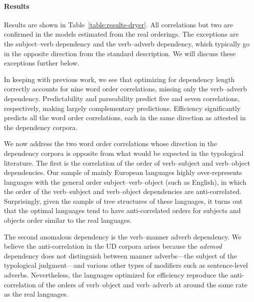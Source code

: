 \documentclass[9pt,twocolumn,twoside,lineno]{pnas-new}
\begin{document}
\paragraph{Results}
Results are shown in Table~\ref{table:results-dryer}.
All correlations but two are confirmed in the models estimated from the real orderings. The exceptions are the subject--verb dependency and the verb--adverb dependency, which typically go in the opposite direction from the standard description.
We will discuss these exceptions further below.

In keeping with previous work, we see that optimizing for dependency length correctly accounts for nine word order correlations, missing only the verb--adverb dependency. 
Predictability and parseability predict five and seven correlations, respectively, making largely complementary predictions.
Efficiency significantly predicts all the word order correlations, each in the same direction as attested in the dependency corpora.

We now address the two word order correlations whose direction in the dependency corpora is opposite from what would be expected in the typological literature. The first is the correlation of the order of verb--subject and verb--object dependencies. Our sample of mainly European languages highly over-represents languages with the general order subject--verb--object (such as English), in which the order of the verb--subject and verb--object dependencies are anti-correlated. Surprisingly, given the sample of tree structures of these languages, it turns out that the optimal languages tend to have anti-correlated orders for subjects and objects order similar to the real languages.

The second anomalous dependency is the verb--manner adverb dependency. We believe the anti-correlation in the UD corpora arises because the \emph{advmod} dependency does not distinguish between manner adverbs---the subject of the typological judgment---and various other types of modifiers such as sentence-level adverbs. Nevertheless, the languages optimized for efficiency reproduce the anti-correlation of the orders of verb--object and verb--adverb at around the same rate as the real languages.
\end{document}
